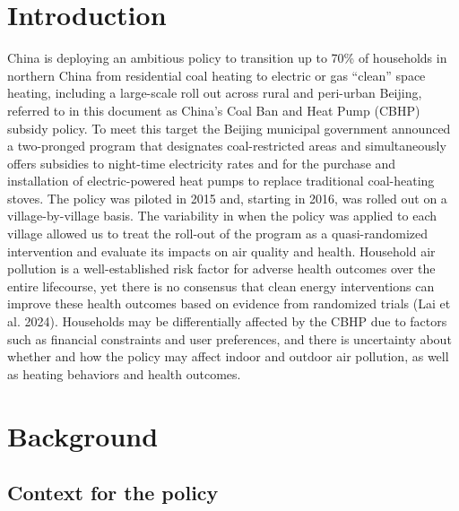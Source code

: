 \documentclass[
  letterpaper,
  DIV=11,
  numbers=noendperiod]{scrartcl}
\begin{document}
\newpage

\section{Introduction}\label{introduction-1}

China is deploying an ambitious policy to transition up to 70\% of
households in northern China from residential coal heating to electric
or gas ``clean'' space heating, including a large-scale roll out across
rural and peri-urban Beijing, referred to in this document as China's
Coal Ban and Heat Pump (CBHP) subsidy policy. To meet this target the
Beijing municipal government announced a two-pronged program that
designates coal-restricted areas and simultaneously offers subsidies to
night-time electricity rates and for the purchase and installation of
electric-powered heat pumps to replace traditional coal-heating stoves.
The policy was piloted in 2015 and, starting in 2016, was rolled out on
a village-by-village basis. The variability in when the policy was
applied to each village allowed us to treat the roll-out of the program
as a quasi-randomized intervention and evaluate its impacts on air
quality and health. Household air pollution is a well-established risk
factor for adverse health outcomes over the entire lifecourse, yet there
is no consensus that clean energy interventions can improve these health
outcomes based on evidence from randomized trials (Lai et al. 2024).
Households may be differentially affected by the CBHP due to factors
such as financial constraints and user preferences, and there is
uncertainty about whether and how the policy may affect indoor and
outdoor air pollution, as well as heating behaviors and health outcomes.

\section{Background}\label{background}

\subsection{Context for the policy}\label{context-for-the-policy}
\end{document}
